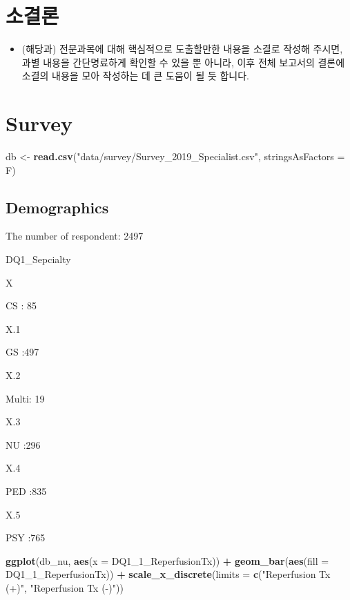 \documentclass[]{book}
\newenvironment{Shaded}{\begin{snugshade}}{\end{snugshade}}
\newcommand{\DataTypeTok}[1]{\textcolor[rgb]{0.13,0.29,0.53}{#1}}
\newcommand{\DecValTok}[1]{\textcolor[rgb]{0.00,0.00,0.81}{#1}}
\newcommand{\KeywordTok}[1]{\textcolor[rgb]{0.13,0.29,0.53}{\textbf{#1}}}
\newcommand{\NormalTok}[1]{#1}
\newcommand{\OperatorTok}[1]{\textcolor[rgb]{0.81,0.36,0.00}{\textbf{#1}}}
\newcommand{\StringTok}[1]{\textcolor[rgb]{0.31,0.60,0.02}{#1}}
\providecommand{\tightlist}{%
  \setlength{\itemsep}{0pt}\setlength{\parskip}{0pt}}
\begin{document}
\hypertarget{section-11}{%
\chapter{소결론}\label{section-11}}

\begin{itemize}
\tightlist
\item
  (해당과) 전문과목에 대해 핵심적으로 도출할만한 내용을 소결로 작성해 주시면, 과별 내용을 간단명료하게 확인할 수 있을 뿐 아니라, 이후 전체 보고서의 결론에 소결의 내용을 모아 작성하는 데 큰 도움이 될 듯 합니다.
\end{itemize}

\hypertarget{survey}{%
\chapter{Survey}\label{survey}}

\begin{Shaded}
\begin{Highlighting}[]
\NormalTok{db <-}\StringTok{ }\KeywordTok{read.csv}\NormalTok{(}\StringTok{"data/survey/Survey_2019_Specialist.csv"}\NormalTok{,}
         \DataTypeTok{stringsAsFactors =}\NormalTok{ F)}
\end{Highlighting}
\end{Shaded}

\hypertarget{demographics}{%
\section{Demographics}\label{demographics}}

The number of respondent: 2497

DQ1\_Sepcialty

X

CS : 85

X.1

GS :497

X.2

Multi: 19

X.3

NU :296

X.4

PED :835

X.5

PSY :765

\begin{Shaded}
\begin{Highlighting}[]
\KeywordTok{ggplot}\NormalTok{(db_nu, }\KeywordTok{aes}\NormalTok{(}\DataTypeTok{x =}\NormalTok{ DQ1_}\DecValTok{1}\NormalTok{_ReperfusionTx)) }\OperatorTok{+}\StringTok{ }
\StringTok{  }\KeywordTok{geom_bar}\NormalTok{(}\KeywordTok{aes}\NormalTok{(}\DataTypeTok{fill =}\NormalTok{ DQ1_}\DecValTok{1}\NormalTok{_ReperfusionTx)) }\OperatorTok{+}
\StringTok{  }\KeywordTok{scale_x_discrete}\NormalTok{(}\DataTypeTok{limits =} \KeywordTok{c}\NormalTok{(}\StringTok{"Reperfusion Tx (+)"}\NormalTok{, }\StringTok{"Reperfusion Tx (-)"}\NormalTok{))}
\end{Highlighting}
\end{Shaded}
\end{document}
